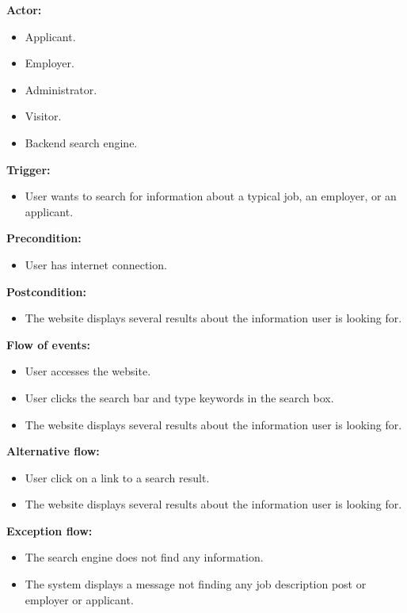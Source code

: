 \documentclass[a4paper]{article}
\begin{document}
        \textbf{Actor:}
        \begin{itemize}
            \item Applicant.
            \item Employer.
            \item Administrator.
            \item Visitor.
            \item Backend search engine.
        \end{itemize}

        \textbf{Trigger:}
        \begin{itemize}
            \item User wants to search for information about a typical job, an employer, or an applicant.
        \end{itemize}

        \textbf{Precondition:}
        \begin{itemize}
            \item User has internet connection.
        \end{itemize}

        \textbf{Postcondition:}
        \begin{itemize}
            \item The website displays several results about the information user is looking for.
        \end{itemize}
        
        \textbf{Flow of events:}
        \begin{itemize}
            \item User accesses the website.
            \item User clicks the search bar and type keywords in the search box.
            \item The website displays several results about the information user is looking for.
        \end{itemize}

        \textbf{Alternative flow:}
        \begin{itemize}
            \item User click on a link to a search result.
            \item The website displays several results about the information user is looking for.
        \end{itemize}

        \textbf{Exception flow:}
        \begin{itemize}
            \item The search engine does not find any information.
            \item The system displays a message not finding any job description post or employer or applicant.
        \end{itemize}
\end{document}
